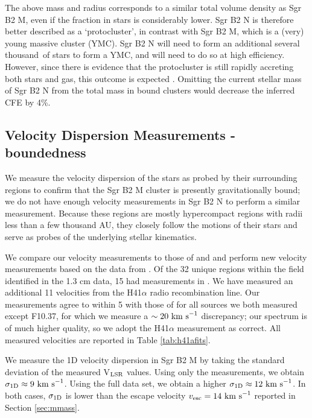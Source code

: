 \documentclass[twocolumn]{aastex62}
\begin{document}
The above mass and radius corresponds to a similar total volume density as Sgr
B2 M, even if the fraction in stars is considerably lower. Sgr B2 N is
therefore better described as a `protocluster', in contrast with
Sgr B2 M, which is a (very) young massive cluster (YMC).  Sgr B2 N will need to
form an additional several thousand~\msun of stars to form a YMC, and will need
to do so at high efficiency.  However, since there is evidence that the
protocluster is still rapidly accreting both stars and gas, this outcome
is expected \citep[cf.][]{Ginsburg2016b}. Omitting the current stellar mass of
Sgr B2 N from the total mass in bound clusters would decrease the inferred CFE
by 4\%.


\subsection{Velocity Dispersion Measurements - boundedness}
\label{sec:vdisp}
We measure the velocity dispersion of the stars as probed by their surrounding
\hii regions to confirm that the Sgr B2 M cluster is presently gravitationally
bound; we do not have enough velocity measurements in Sgr B2 N to perform a
similar measurement.
Because these regions are mostly hypercompact \hii regions with radii less than a few
thousand AU, they closely follow the motions of their stars and serve as 
probes of the underlying stellar kinematics.

We compare our velocity measurements to those of \citet{De-Pree2011a} and
\citet{De-Pree1996a} and perform  new velocity measurements based on the
data from \citet{Ginsburg2018a}.  Of the 32 unique \hii regions within the field
identified in the \citet{Gaume1995a} 1.3 cm data, 
15 had measurements in \citet{De-Pree2011a}.  We have measured an additional 11
velocities from the H41$\alpha$ radio recombination line.  Our measurements
agree to within 5 \kms with those of \citet{De-Pree2011a} for all sources we
both measured except F10.37, for which we measure a $\sim20~\textrm{km~s}^{-1}$ discrepancy;
our spectrum is of much higher quality, so we adopt the H41$\alpha$ measurement
as correct.  All measured velocities are reported in Table \ref{tab:h41afits}.

We measure the 1D velocity dispersion in Sgr B2 M by taking the standard
deviation of the measured V$_{\rm LSR}$ values.  Using only the
\citet{De-Pree2011a} measurements, we obtain $\sigma_{\rm 1D}\approx9~\textrm{km~s}^{-1}$.  Using
the full data set, we obtain a higher $\sigma_{\rm 1D}\approx12~\textrm{km~s}^{-1}$.  In both
cases, $\sigma_{\rm 1D}$ is  lower than the escape velocity
$v_{\rm esc}=14~\textrm{km~s}^{-1}$ reported in Section \ref{sec:mmass}.
\end{document}
